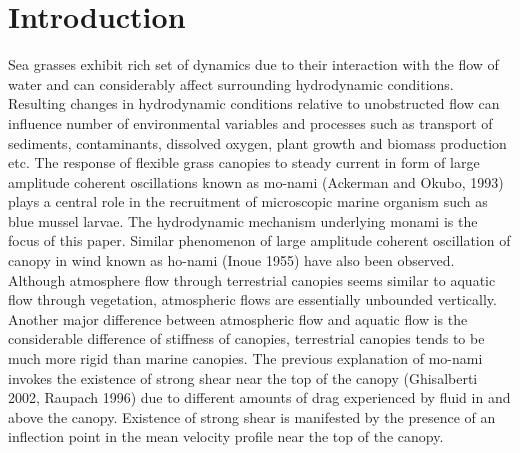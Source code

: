 \documentclass[aps,twocolumn,floatfix,prl,10pt]{revtex4-1}
\begin{document}
\section{Introduction}
Sea grasses exhibit rich set of dynamics due to their interaction with the flow of water and can considerably affect surrounding hydrodynamic conditions.
Resulting changes in hydrodynamic conditions relative to unobstructed flow can influence number of environmental variables and processes such as 
transport of sediments, contaminants, dissolved oxygen, plant growth and biomass production etc. 
The response of flexible grass canopies to steady current in form of large amplitude coherent oscillations known as mo-nami (Ackerman and Okubo, 1993) plays a central role
in the recruitment of microscopic marine organism such as blue mussel larvae. The hydrodynamic mechanism underlying monami is the focus of this paper. 
Similar phenomenon of large amplitude coherent oscillation of canopy in wind known as ho-nami (Inoue 1955) have also been observed.
\newline
Although atmosphere flow through terrestrial canopies seems similar to aquatic flow through vegetation, atmospheric flows are essentially unbounded vertically. Another major
difference between atmospheric flow and aquatic flow is the considerable difference of stiffness of canopies, terrestrial canopies tends to be much more rigid than marine canopies.
\newline   
The previous explanation of mo-nami invokes the existence of strong shear near the top of the canopy (Ghisalberti 2002, Raupach 1996) due to
different amounts of drag experienced by fluid in and above the canopy. Existence of strong shear is manifested by
the presence of an inflection point in the mean velocity profile near the top of the canopy.
\end{document}
